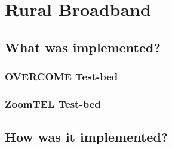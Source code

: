 \chapter{Rural Broadband}
\label{chapter3}


\section{What was implemented?}

\subsection{OVERCOME Test-bed}


\subsection{ZoomTEL Test-bed}



\section{How was it implemented?}


